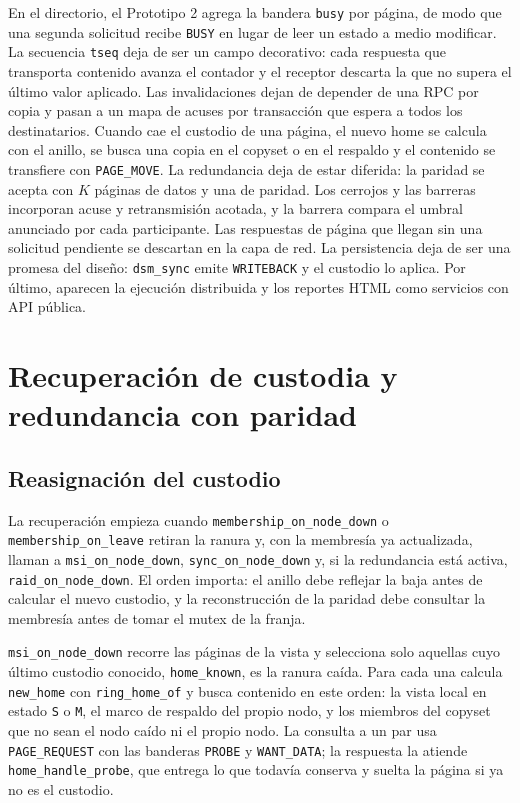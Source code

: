 \documentclass[11pt,spanish]{article}
\begin{document}
En el directorio, el Prototipo 2 agrega la bandera \texttt{busy} por página, de modo que una segunda solicitud recibe \texttt{BUSY} en lugar de leer un estado a medio modificar. La secuencia \texttt{tseq} deja de ser un campo decorativo: cada respuesta que transporta contenido avanza el contador y el receptor descarta la que no supera el último valor aplicado. Las invalidaciones dejan de depender de una RPC por copia y pasan a un mapa de acuses por transacción que espera a todos los destinatarios. Cuando cae el custodio de una página, el nuevo home se calcula con el anillo, se busca una copia en el copyset o en el respaldo y el contenido se transfiere con \texttt{PAGE\_MOVE}. La redundancia deja de estar diferida: la paridad se acepta con $K$ páginas de datos y una de paridad. Los cerrojos y las barreras incorporan acuse y retransmisión acotada, y la barrera compara el umbral anunciado por cada participante. Las respuestas de página que llegan sin una solicitud pendiente se descartan en la capa de red. La persistencia deja de ser una promesa del diseño: \texttt{dsm\_sync} emite \texttt{WRITEBACK} y el custodio lo aplica. Por último, aparecen la ejecución distribuida y los reportes HTML como servicios con API pública.

\section{Recuperación de custodia y redundancia con paridad}\label{sec:custodia_paridad}

\subsection{Reasignación del custodio}

La recuperación empieza cuando \texttt{membership\_on\_node\_down} o \texttt{membership\_on\_leave} retiran la ranura y, con la membresía ya actualizada, llaman a \texttt{msi\_on\_node\_down}, \texttt{sync\_on\_node\_down} y, si la redundancia está activa, \texttt{raid\_on\_node\_down}. El orden importa: el anillo debe reflejar la baja antes de calcular el nuevo custodio, y la reconstrucción de la paridad debe consultar la membresía antes de tomar el mutex de la franja.

\texttt{msi\_on\_node\_down} recorre las páginas de la vista y selecciona solo aquellas cuyo último custodio conocido, \texttt{home\_known}, es la ranura caída. Para cada una calcula \texttt{new\_home} con \texttt{ring\_home\_of} y busca contenido en este orden: la vista local en estado \texttt{S} o \texttt{M}, el marco de respaldo del propio nodo, y los miembros del copyset que no sean el nodo caído ni el propio nodo. La consulta a un par usa \texttt{PAGE\_REQUEST} con las banderas \texttt{PROBE} y \texttt{WANT\_DATA}; la respuesta la atiende \texttt{home\_handle\_probe}, que entrega lo que todavía conserva y suelta la página si ya no es el custodio.
\end{document}
